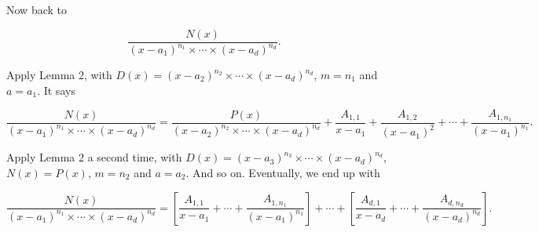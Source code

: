 Now back to

\[
    \frac{N(x)}{{(x-a_1)}^{n_1} \times \cdots \times {(x-a_d)}^{n_d}}.
\]

Apply Lemma 2, with \(D(x) = {(x - a_2)}^{n_2} \times \cdots \times {(x - a_d)}^{n_d}\), \(m = n_1\) and 
\(a = a_1\). It says

\[
    \frac{N(x)}{{(x-a_1)}^{n_1} \times \cdots \times {(x-a_d)}^{n_d}} = \frac{P(x)}{{(x-a_2)}^{n_2} 
    \times \cdots \times {(x-a_d)}^{n_d}} + \frac{A_{1,1}}{x-a_1} + \frac{A_{1,2}}{{(x-a_1)}^2} + \cdots + 
    \frac{A_{1,n_1}}{{(x-a_1)}^{n_1}}.
\]

Apply Lemma 2 a second time, with \(D(x) = {(x - a_3)}^{n_3} \times \cdots \times {(x - a_d)}^{n_d}\), 
\(N(x) = P(x)\), \(m = n_2\) and \(a = a_2\). And so on. Eventually, we end up with

\[
    \frac{N(x)}{{(x-a_1)}^{n_1} \times \cdots \times {(x-a_d)}^{n_d}} = \left[ \frac{A_{1,1}}{x-a_1} + 
    \cdots + \frac{A_{1,n_1}}{{(x-a_1)}^{n_1}} \right] + \cdots + \left[ \frac{A_{d,1}}{x-a_d} + \cdots + 
    \frac{A_{d,n_d}}{{(x-a_d)}^{n_d}} \right].
\]
